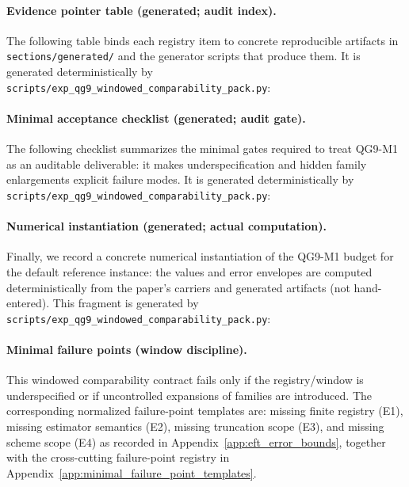 \paragraph{Evidence pointer table (generated; audit index).}
\AuditTag The following table binds each registry item to concrete reproducible artifacts in \texttt{sections/generated/}
and the generator scripts that produce them. It is generated deterministically by
\texttt{scripts/exp\_qg9\_windowed\_comparability\_pack.py}:


\paragraph{Minimal acceptance checklist (generated; audit gate).}
\AuditTag The following checklist summarizes the minimal gates required to treat QG9-M1 as an auditable deliverable:
it makes underspecification and hidden family enlargements explicit failure modes.
It is generated deterministically by \texttt{scripts/exp\_qg9\_windowed\_comparability\_pack.py}:


\paragraph{Numerical instantiation (generated; actual computation).}
\AuditTag Finally, we record a concrete numerical instantiation of the QG9-M1 budget for the default reference instance:
the values and error envelopes are computed deterministically from the paper's carriers and generated artifacts (not hand-entered).
This fragment is generated by \texttt{scripts/exp\_qg9\_windowed\_comparability\_pack.py}:



\paragraph{Minimal failure points (window discipline).}
\AuditTag This windowed comparability contract fails only if the registry/window is underspecified or if uncontrolled expansions of families are introduced.
The corresponding normalized failure-point templates are:
missing finite registry (E1), missing estimator semantics (E2), missing truncation scope (E3), and missing scheme scope (E4)
as recorded in Appendix~\ref{app:eft_error_bounds}, together with the cross-cutting failure-point registry in Appendix~\ref{app:minimal_failure_point_templates}.

